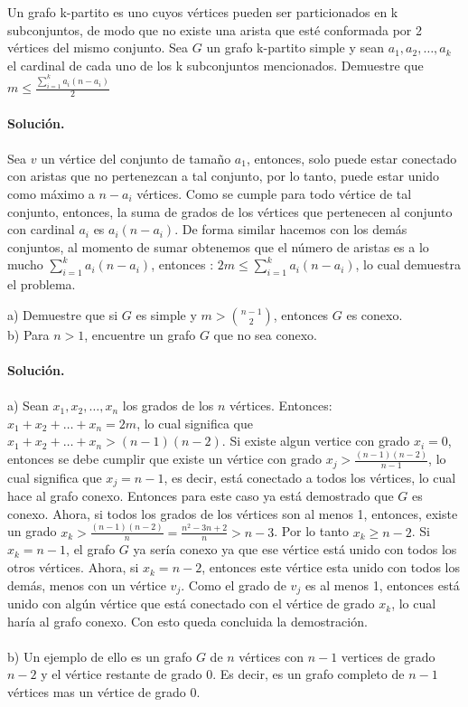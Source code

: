 \documentclass[12pt]{article}
\newenvironment{ejercicio}[2][Ejercicio]{\begin{trivlist}
\item[\hskip \labelsep {\bfseries #1}\hskip \labelsep {\bfseries #2.}]}{\end{trivlist}}
\begin{document}
\begin{ejercicio}{1.1.10}
\end{ejercicio}
Un grafo k-partito es uno cuyos vértices pueden ser particionados en k subconjuntos, de modo que no existe una arista que esté conformada por 2 vértices del mismo conjunto. Sea $G$ un grafo k-partito simple y sean $a_1, a_2, \ldots, a_k$ el cardinal de cada uno de los k subconjuntos mencionados. Demuestre que $m \leq \frac{\sum_{i=1}^{k}a_i(n-a_i)}{2}$
\\\\
\textbf{Solución.} 
\\\\
Sea $v$ un vértice del conjunto de tamaño $a_1$, entonces, solo puede estar conectado con aristas que no pertenezcan a tal conjunto, por lo tanto, puede estar unido como máximo a $n-a_i$ vértices. Como se cumple para todo vértice de tal conjunto, entonces, la suma de grados de los vértices que pertenecen al conjunto con cardinal $a_i$ es $a_i(n-a_i)$. 
De forma similar hacemos con los demás conjuntos, al momento de sumar obtenemos que el número de aristas es a lo mucho $\sum_{i=1}^{k}a_i(n-a_i)$, entonces : $2m \leq \sum_{i=1}^{k}a_i(n-a_i)$, lo cual demuestra el problema.

\begin{ejercicio}{1.1.12}
\end{ejercicio}
a) Demuestre que si $G$ es simple y $ m > \binom{n-1}{2}$, entonces $G$ es conexo.
\\
b) Para $n > 1$, encuentre un grafo $G$ que no sea conexo.
\\\\
\textbf{Solución.} 
\\\\
a) Sean $x_1, x_2, \ldots, x_n$ los grados de los $n$ vértices. Entonces:
$x_1 + x_2 + \ldots + x_n = 2m$, lo cual significa que $x_1 + x_2 + \ldots + x_n > (n-1)(n-2) $. Si existe algun vertice con grado $x_i = 0$, entonces se debe cumplir que existe un vértice con grado $x_j > \frac{(n-1)(n-2)}{n-1}$, lo cual significa que $x_j = n-1$, es decir, está conectado a todos los vértices, lo cual hace al grafo conexo. Entonces para este caso ya está demostrado que $G$ es conexo. Ahora, si todos los grados de los vértices son al menos 1, entonces, existe un grado $x_k > \frac{(n-1)(n-2)}{n} = \frac{n^2 - 3n + 2}{n} > n-3 $. Por lo tanto $ x_k \geq n-2 $. Si $x_k = n-1$, el grafo $G$ ya sería conexo ya que ese vértice está unido con todos los otros vértices. Ahora, si $x_k = n-2$, entonces este vértice esta unido con todos los demás, menos con un vértice $v_j$. Como el grado de $v_j$ es al menos 1, entonces está unido con algún vértice que está conectado con el vértice de grado $x_k$, lo cual haría al grafo conexo. Con esto queda concluida la demostración.
\\\\
b) Un ejemplo de ello es un grafo $G$ de $n$ vértices con $n-1$ vertices de grado $n-2$ y el vértice restante de grado 0. Es decir, es un grafo completo de $n-1$ vértices mas un vértice de grado 0.
\end{document}
